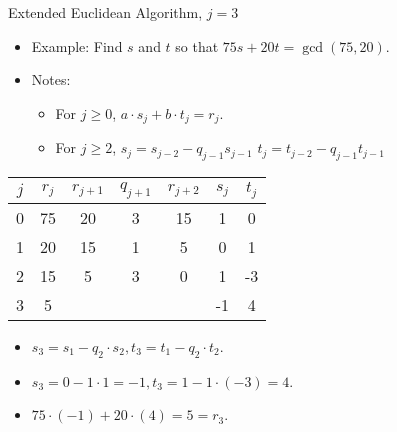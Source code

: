 \documentclass{beamer}
\begin{document}
\begin{frame}{Extended Euclidean Algorithm, $j=3$}

\begin{itemize}
  \item Example: Find $s$ and $t$ so that $75s+20t = \gcd(75, 20)$.
  \item Notes:
  \begin{itemize}
    \item For $j\geq0$, $a \cdot s_j + b \cdot t_j = r_j$.
    \item For $j\geq 2$, $s_j=s_{j-2} - q_{j-1}s_{j-1}$ \quad $t_j=t_{j-2} - q_{j-1}t_{j-1}$
  \end{itemize}
\end{itemize}

\vspace{1em}

\begin{tabular}{|c|c|c|c|c|c|c|}\hline
$j$   &  $r_{j}$    & $r_{j+1}$ & $q_{j+1}$ & $r_{j+2}$ & $s_j$ & $t_j$ \\ \hline\hline
0     &  75         &  20       &    3      &   15      &  1    &   0   \\ \hline
1     &  20         &  15       &    1      &    5      &  0    &   1   \\ \hline
2     &  15         &   5       &    3      &    0      &  1    &  -3   \\ \hline
3     &   5         &           &           &           & -1    &   4   \\ \hline
\end{tabular}

\vspace{1em}

\begin{itemize}
  \item $s_3 = s_1 - q_2 \cdot s_2, t_3 = t_1 - q_2 \cdot t_2$.
  \item $s_3 =0 - 1 \cdot 1 = -1, t_3 = 1 - 1 \cdot (-3) = 4$.
  \item $75\cdot (-1) + 20 \cdot (4) = 5 = r_3$.
\end{itemize}

\end{frame}
\end{document}
